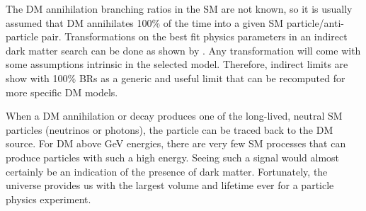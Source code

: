 \begin{figure}[h]
\end{figure}

The DM annihilation branching ratios in the SM are not known, so it is usually assumed that DM annihilates 100\% of the time into a given SM particle/anti-particle pair.
Transformations on the best fit physics parameters in an indirect dark matter search can be done as shown by \cite{directdetect:transform,les_houches:harris}.
Any transformation will come with some assumptions intrinsic in the selected model.
Therefore, indirect limits are show with 100\% BRs as a generic and useful limit that can be recomputed for more specific DM models.

When a DM annihilation or decay produces one of the long-lived, neutral SM particles (neutrinos or photons), the particle can be traced back to the DM source.
For DM above GeV energies, there are very few SM processes that can produce particles with such a high energy.
Seeing such a signal would almost certainly be an indication of the presence of dark matter.
Fortunately, the universe  provides us with the largest volume and lifetime ever for a particle physics experiment.

